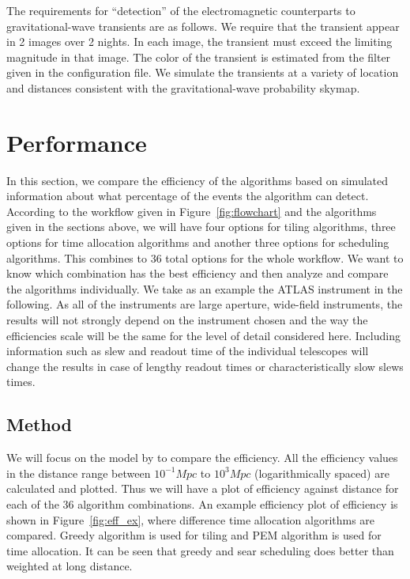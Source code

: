 \documentclass[twocolumn]{aastex62}
\begin{document}
The requirements for ``detection'' of the electromagnetic counterparts to gravitational-wave transients are as follows.
We require that the transient appear in 2 images over 2 nights.
In each image, the transient must exceed the limiting magnitude in that image.
The color of the transient is estimated from the filter given in the configuration file.
We simulate the transients at a variety of location and distances consistent with the gravitational-wave probability skymap.


\section{Performance}
\label{sec:performance}
In this section, we compare the efficiency of the algorithms based on simulated information about what percentage of the events the algorithm can detect. According to the workflow given in Figure~\ref{fig:flowchart} and the algorithms given in the sections above, we will have four options for tiling algorithms, three options for time allocation algorithms and another three options for scheduling algorithms. This combines to 36 total options for the whole workflow. We want to know which combination has the best efficiency and then analyze and compare the algorithms individually.
We take as an example the ATLAS instrument in the following. 
As all of the instruments are large aperture, wide-field instruments, the results will not strongly depend on the instrument chosen and the way the efficiencies scale will be the same for the level of detail considered here.
Including information such as slew and readout time of the individual telescopes will change the results in case of lengthy readout times or characteristically slow slews times.
\subsection{Method}
We will focus on the model by \cite{Me2017} to compare the efficiency. All the efficiency values in the distance range between $10^{-1} Mpc$ to $10^3 Mpc$ (logarithmically spaced) are calculated and plotted. Thus we will have a plot of efficiency against distance for each of the 36 algorithm combinations. An example efficiency plot of efficiency is shown in Figure~\ref{fig:eff_ex}, where difference time allocation algorithms are compared. Greedy algorithm is used for tiling and PEM algorithm is used for time allocation. It can be seen that greedy and sear scheduling does better than weighted at long distance. 
\end{document}
